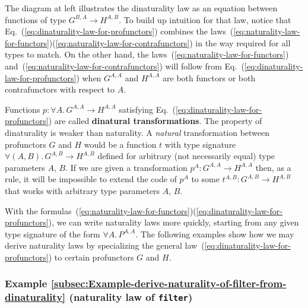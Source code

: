 The diagram at left illustrates the dinaturality law as an equation
between functions of type $G^{B,A}\rightarrow H^{A,B}$. To build
up intuition for that law, notice that Eq.~(\ref{eq:dinaturality-law-for-profunctors})
combines the laws~(\ref{eq:naturality-law-for-functors})\textendash (\ref{eq:naturality-law-for-contrafunctors})
in the way required for all types to match. On the other hand, the
laws~(\ref{eq:naturality-law-for-functors}) and~(\ref{eq:naturality-law-for-contrafunctors})
will follow from Eq.~(\ref{eq:dinaturality-law-for-profunctors})
when $G^{A,A}$ and $H^{A,A}$ are both functors or both contrafunctors
with respect to $A$.

Functions $p:\forall A.\,G^{A,A}\rightarrow H^{A,A}$ satisfying Eq.~(\ref{eq:dinaturality-law-for-profunctors})
are called \textbf{dinatural transformations}.
The property of dinaturality is weaker than naturality.\emph{ }A \emph{natural}
transformation between profunctors $G$ and $H$ would be a function
$t$ with type signature $\forall(A,B).\,G^{A,B}\rightarrow H^{A,B}$
defined for arbitrary (not necessarily equal) type parameters $A$,
$B$. If we are given a transformation $p^{A}:G^{A,A}\rightarrow H^{A,A}$
then, as a rule, it will be impossible to extend the code of $p^{A}$
to some $t^{A,B}:G^{A,B}\rightarrow H^{A,B}$ that works with arbitrary
type parameters $A$, $B$.

With the formulas~(\ref{eq:naturality-law-for-functors})\textendash (\ref{eq:dinaturality-law-for-profunctors}),
we can write naturality laws more quickly, starting from any given
type signature of the form $\forall A.\,P^{A,A}$. The following examples
show how we may derive naturality laws by specializing the general
law~(\ref{eq:dinaturality-law-for-profunctors}) to certain profunctors
$G$ and $H$.

\subsubsection{Example \label{subsec:Example-derive-naturality-of-filter-from-dinaturality}\ref{subsec:Example-derive-naturality-of-filter-from-dinaturality}
(naturality law of \lstinline!filter!)}

